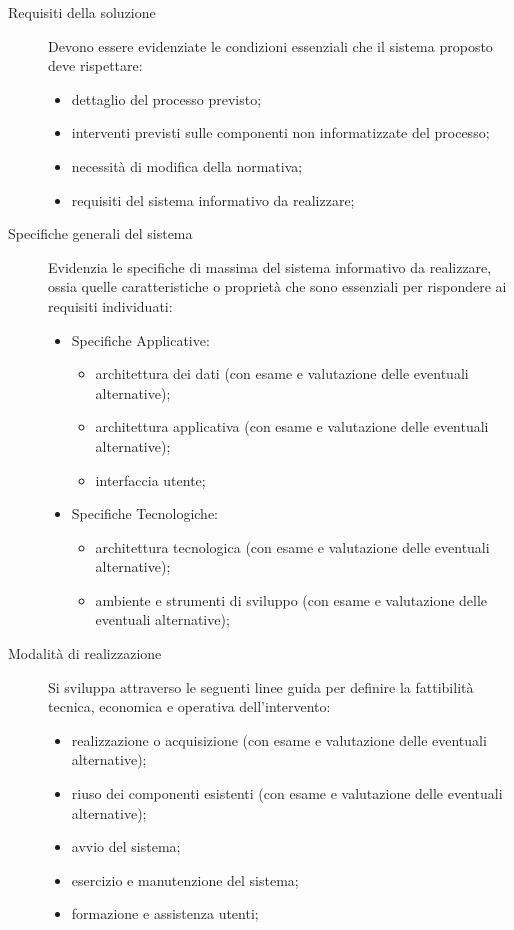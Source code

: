 \begin{description}
    \item[Requisiti della soluzione] Devono essere evidenziate le condizioni essenziali che il sistema proposto deve rispettare:
        \begin{itemize}
            \item dettaglio del processo previsto;
            \item interventi previsti sulle componenti non informatizzate del processo;
            \item necessità di modifica della normativa;
            \item requisiti del sistema informativo da realizzare;
        \end{itemize}
    
    \item[Specifiche generali del sistema] Evidenzia le specifiche di massima del sistema informativo da realizzare, ossia quelle caratteristiche o proprietà  che sono essenziali per rispondere ai requisiti individuati:
        \begin{itemize}
            \item Specifiche Applicative:
                \begin{itemize}
                    \item architettura dei dati (con esame e valutazione delle eventuali alternative);
                    \item architettura applicativa (con esame e valutazione delle eventuali alternative);
                    \item interfaccia utente;
                \end{itemize}
            \item Specifiche Tecnologiche:
                \begin{itemize}
                    \item architettura tecnologica (con esame e valutazione delle eventuali alternative);
                    \item ambiente e strumenti di sviluppo (con esame e valutazione delle eventuali alternative);
                \end{itemize}
        \end{itemize}
    \item[Modalità di realizzazione] Si sviluppa attraverso le seguenti linee guida per definire la fattibilità tecnica, economica e operativa dell'intervento:
        \begin{itemize}
            \item realizzazione o acquisizione (con esame e valutazione delle eventuali alternative);
            \item riuso dei componenti esistenti (con esame e valutazione delle eventuali alternative);
            \item avvio del sistema;
            \item esercizio e manutenzione del sistema;
            \item formazione e assistenza utenti;
        \end{itemize}
\end{description}
%
